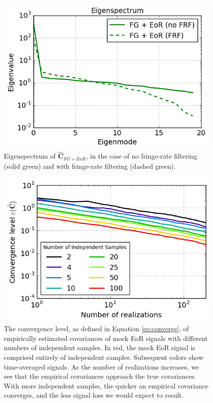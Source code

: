 \documentclass[preprint2,numberedappendix,tighten]{aastex6}  %
\begin{document}
\begin{figure}
	\centering
	\includegraphics[trim={0cm 0cm 0cm 0cm},clip,height=0.31\textwidth]{plots/toy_sigloss15.png}
	\caption{Eigenspectrum of $\widehat{\textbf{C}}_{FG+EoR}$, in the case of no fringe-rate filtering (solid green) and with fringe-rate filtering (dashed green).}
	\label{fig:toy_sigloss15}
\end{figure}

\begin{figure}
	\centering
	\includegraphics[width=\columnwidth]{plots/toy_sigloss16.png}
	\caption{The convergence level, as defined in Equation \eqref{eq:converge}, of empirically estimated covariances of mock EoR signals with different numbers of independent samples. In red, the mock EoR signal is comprised entirely of independent samples. Subsequent colors show time-averaged signals. As the number of realizations increases, we see that the empirical covariances approach the true covariances. With more independent samples, the quicker an empirical covariance converges, and the less signal loss we would expect to result.}
	\label{fig:toy_sigloss16}
\end{figure}
\end{document}
